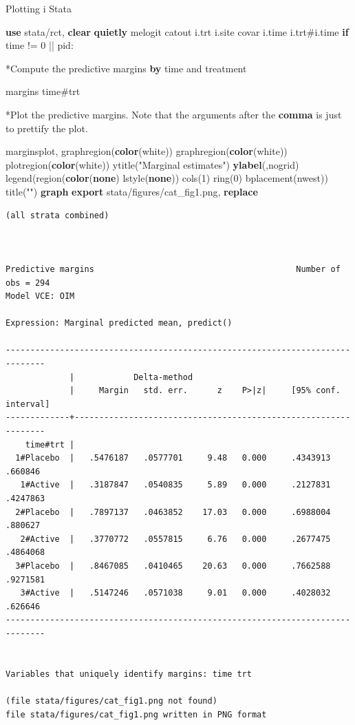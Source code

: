 \documentclass[
]{book}
\newenvironment{Shaded}{\begin{snugshade}}{\end{snugshade}}
\newcommand{\BaseNTok}[1]{\textcolor[rgb]{0.00,0.00,0.81}{#1}}
\newcommand{\KeywordTok}[1]{\textcolor[rgb]{0.13,0.29,0.53}{\textbf{#1}}}
\newcommand{\NormalTok}[1]{#1}
\newcommand{\StringTok}[1]{\textcolor[rgb]{0.31,0.60,0.02}{#1}}
\begin{document}
Plotting i Stata

\begin{Shaded}
\begin{Highlighting}[]
\KeywordTok{use}\NormalTok{ stata/rct, }\KeywordTok{clear} 
\KeywordTok{quietly}\NormalTok{ melogit catout i.trt i.site covar i.time i.trt\#i.time }\KeywordTok{if}\NormalTok{ time != 0 || pid: }

\NormalTok{*Compute the predictive margins }\KeywordTok{by}\NormalTok{ time and treatment}

\NormalTok{margins time\#trt}

\NormalTok{*Plot the predictive margins. Note that the arguments after the }\KeywordTok{comma}\NormalTok{ is just to prettify the plot.}

\NormalTok{marginsplot, graphregion(}\KeywordTok{color}\NormalTok{(}\BaseNTok{white}\NormalTok{)) graphregion(}\KeywordTok{color}\NormalTok{(}\BaseNTok{white}\NormalTok{)) }\BaseNTok{plotregion}\NormalTok{(}\KeywordTok{color}\NormalTok{(}\BaseNTok{white}\NormalTok{)) }\BaseNTok{ytitle}\NormalTok{(}\StringTok{"Marginal estimates"}\NormalTok{) }\KeywordTok{ylabel}\NormalTok{(,}\BaseNTok{nogrid}\NormalTok{)  }\BaseNTok{legend}\NormalTok{(region(}\KeywordTok{color}\NormalTok{(}\KeywordTok{none}\NormalTok{) lstyle(}\KeywordTok{none}\NormalTok{)) }\BaseNTok{cols}\NormalTok{(1) }\BaseNTok{ring}\NormalTok{(0) bplacement(nwest)) }\BaseNTok{title}\NormalTok{(}\StringTok{""}\NormalTok{)}
\KeywordTok{graph} \KeywordTok{export}\NormalTok{ stata/figures/cat\_fig1.png, }\KeywordTok{replace} 
\end{Highlighting}
\end{Shaded}

\begin{verbatim}
(all strata combined)



Predictive margins                                         Number of obs = 294
Model VCE: OIM

Expression: Marginal predicted mean, predict()

------------------------------------------------------------------------------
             |            Delta-method
             |     Margin   std. err.      z    P>|z|     [95% conf. interval]
-------------+----------------------------------------------------------------
    time#trt |
  1#Placebo  |   .5476187   .0577701     9.48   0.000     .4343913     .660846
   1#Active  |   .3187847   .0540835     5.89   0.000     .2127831    .4247863
  2#Placebo  |   .7897137   .0463852    17.03   0.000     .6988004     .880627
   2#Active  |   .3770772   .0557815     6.76   0.000     .2677475    .4864068
  3#Placebo  |   .8467085   .0410465    20.63   0.000     .7662588    .9271581
   3#Active  |   .5147246   .0571038     9.01   0.000     .4028032     .626646
------------------------------------------------------------------------------


Variables that uniquely identify margins: time trt

(file stata/figures/cat_fig1.png not found)
file stata/figures/cat_fig1.png written in PNG format
\end{verbatim}
\end{document}
